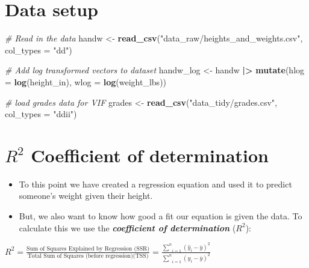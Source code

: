 \documentclass[
]{article}
\newenvironment{Shaded}{\begin{snugshade}}{\end{snugshade}}
\newcommand{\AttributeTok}[1]{\textcolor[rgb]{0.13,0.29,0.53}{#1}}
\newcommand{\CommentTok}[1]{\textcolor[rgb]{0.56,0.35,0.01}{\textit{#1}}}
\newcommand{\FunctionTok}[1]{\textcolor[rgb]{0.13,0.29,0.53}{\textbf{#1}}}
\newcommand{\NormalTok}[1]{#1}
\newcommand{\OtherTok}[1]{\textcolor[rgb]{0.56,0.35,0.01}{#1}}
\newcommand{\SpecialCharTok}[1]{\textcolor[rgb]{0.81,0.36,0.00}{\textbf{#1}}}
\newcommand{\StringTok}[1]{\textcolor[rgb]{0.31,0.60,0.02}{#1}}
\begin{document}
\hypertarget{data-setup}{%
\section{Data setup}\label{data-setup}}

\begin{Shaded}
\begin{Highlighting}[]
\CommentTok{\# Read in the data}
\NormalTok{handw }\OtherTok{\textless{}{-}}
  \FunctionTok{read\_csv}\NormalTok{(}\StringTok{"data\_raw/heights\_and\_weights.csv"}\NormalTok{,}
           \AttributeTok{col\_types =} \StringTok{"dd"}\NormalTok{)}


\CommentTok{\# Add log transformed vectors to dataset}
\NormalTok{handw\_log }\OtherTok{\textless{}{-}}
\NormalTok{  handw }\SpecialCharTok{|\textgreater{}}
  \FunctionTok{mutate}\NormalTok{(}\AttributeTok{hlog =} \FunctionTok{log}\NormalTok{(height\_in),  }
         \AttributeTok{wlog =} \FunctionTok{log}\NormalTok{(weight\_lbs))}

\CommentTok{\# load grades data for VIF}
\NormalTok{grades }\OtherTok{\textless{}{-}}
  \FunctionTok{read\_csv}\NormalTok{(}\StringTok{"data\_tidy/grades.csv"}\NormalTok{,}
           \AttributeTok{col\_types =} \StringTok{"ddii"}\NormalTok{)}
\end{Highlighting}
\end{Shaded}

\hypertarget{r2-coefficient-of-determination}{%
\section{\texorpdfstring{\(R^{2}\) Coefficient of
determination}{R\^{}\{2\} Coefficient of determination}}\label{r2-coefficient-of-determination}}

\begin{itemize}
\item
  To this point we have created a regression equation and used it to
  predict someone's weight given their height.
\item
  But, we also want to know how good a fit our equation is given the
  data. To calculate this we use the \textbf{\emph{coefficient of
  determination}} (\(R^2\)):
\end{itemize}

\(R^2 = \frac{\text{Sum of Squares Explained by Regression (SSR)}}{\text{Total Sum of Squares (before regression)(TSS)}} = \frac{\underset{i=1}{\stackrel{n}{\sum}}(\hat{y}_{i} - \overline{y})^2}{\underset{i=1}{\stackrel{n}{\sum}}(y_{i} - \overline{y})^{2}}\)
\end{document}
